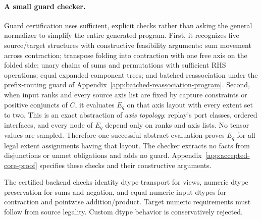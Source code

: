 \paragraph{A small guard checker.}
Guard certification uses sufficient, explicit checks rather than
asking the general normalizer to simplify the entire generated program.
First, it recognizes five source/target structures with constructive
feasibility arguments: sum movement across contraction; transpose folding into contraction with
one free axis on the folded side; unary chains of
sums and permutations with sufficient RHS operations; equal expanded
component trees; and batched reassociation under the prefix-routing guard
of Appendix~\ref{app:batched-reassociation-program}.
Second, when input ranks and every source axis list are fixed by capture
constraints or positive conjuncts of $C$, it evaluates $E_q$ on that axis
layout with every extent set to two. This is an exact abstraction of
\emph{axis topology}: replay's port classes, ordered interfaces, and every
node of $E_q$ depend only on ranks and axis lists. No tensor values are
sampled. Therefore one successful abstract evaluation proves $E_q$ for
all legal extent assignments having that layout. The checker extracts no
facts from disjunctions or unmet obligations and adds no guard.
Appendix~\ref{app:accepted-core-proof} specifies these checks and their
constructive arguments.

The certified backend checks identity dtype transport for views, numeric
dtype preservation for sums and negation, and equal numeric input dtypes
for contraction and pointwise addition/product. Target numeric requirements
must follow from source legality. Custom dtype behavior is conservatively rejected.

